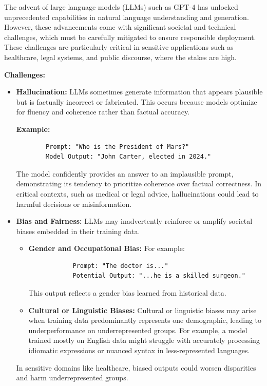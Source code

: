 \begin{flushleft}
    \large The advent of large language models (LLMs) such as GPT-4 has unlocked unprecedented capabilities in natural language understanding and generation. However, these advancements come with significant societal and technical challenges, which must be carefully mitigated to ensure responsible deployment. These challenges are particularly critical in sensitive applications such as healthcare, legal systems, and public discourse, where the stakes are high.

    \textbf{Challenges:}
    \begin{itemize}
        \item \textbf{Hallucination:} LLMs sometimes generate information that appears plausible but is factually incorrect or fabricated. This occurs because models optimize for fluency and coherence rather than factual accuracy. 

        \textbf{Example:} 
        \begin{verbatim}
        Prompt: "Who is the President of Mars?"
        Model Output: "John Carter, elected in 2024."
        \end{verbatim}
        The model confidently provides an answer to an implausible prompt, demonstrating its tendency to prioritize coherence over factual correctness. In critical contexts, such as medical or legal advice, hallucinations could lead to harmful decisions or misinformation.

        \item \textbf{Bias and Fairness:} LLMs may inadvertently reinforce or amplify societal biases embedded in their training data. 
        \begin{itemize}
            \item \textbf{Gender and Occupational Bias:} For example:
            \begin{verbatim}
            Prompt: "The doctor is..."
            Potential Output: "...he is a skilled surgeon."
            \end{verbatim}
            This output reflects a gender bias learned from historical data.
            \item \textbf{Cultural or Linguistic Biases:} Cultural or linguistic biases may arise when training data predominantly represents one demographic, leading to underperformance on underrepresented groups. For example, a model trained mostly on English data might struggle with accurately processing idiomatic expressions or nuanced syntax in less-represented languages.
        \end{itemize}
        In sensitive domains like healthcare, biased outputs could worsen disparities and harm underrepresented groups.


\end{itemize}
\end{flushleft}
